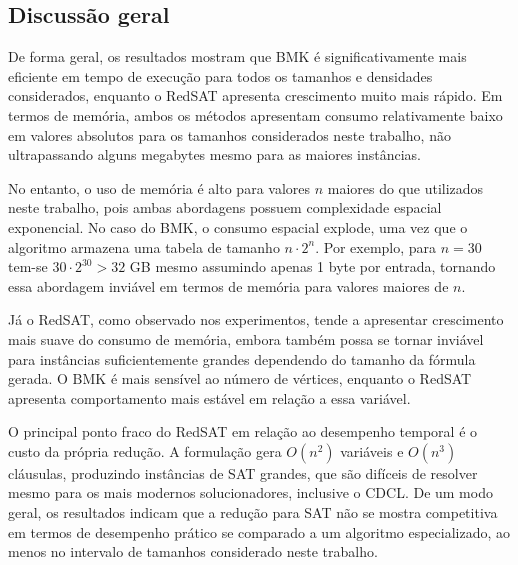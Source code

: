 \subsection{Discussão geral}

De forma geral, os resultados mostram que BMK é significativamente mais eficiente em tempo de execução para todos os tamanhos e densidades considerados, enquanto o RedSAT apresenta crescimento muito mais rápido. Em termos de memória, ambos os métodos apresentam consumo relativamente baixo em valores absolutos para os tamanhos considerados neste trabalho, não ultrapassando alguns megabytes mesmo para as maiores instâncias. 

No entanto, o uso de memória é alto para valores $n$ maiores do que utilizados neste trabalho, pois ambas abordagens possuem complexidade espacial exponencial. No caso do BMK, o consumo espacial explode, uma vez que o algoritmo armazena uma tabela de tamanho $n\cdot2^n$. Por exemplo, para $n=30$ tem-se $30\cdot2^{30} > 32$ GB mesmo assumindo apenas 1 byte por entrada, tornando essa abordagem inviável em termos de memória para valores maiores de $n$.

Já o RedSAT, como observado nos experimentos, tende a apresentar crescimento mais suave do consumo de memória, embora também possa se tornar inviável para instâncias suficientemente grandes dependendo do tamanho da fórmula gerada. O BMK é mais sensível ao número de vértices, enquanto o RedSAT apresenta comportamento mais estável em relação a essa variável.

O principal ponto fraco do RedSAT em relação ao desempenho temporal é o custo da própria redução. A formulação gera $O(n^2)$ variáveis e $O(n^3)$ cláusulas, produzindo instâncias de SAT grandes, que são difíceis de resolver mesmo para os mais modernos solucionadores, inclusive o CDCL. De um modo geral, os resultados indicam que a redução para SAT não se mostra competitiva em termos de desempenho prático se comparado a um algoritmo especializado, ao menos no intervalo de tamanhos considerado neste trabalho.
